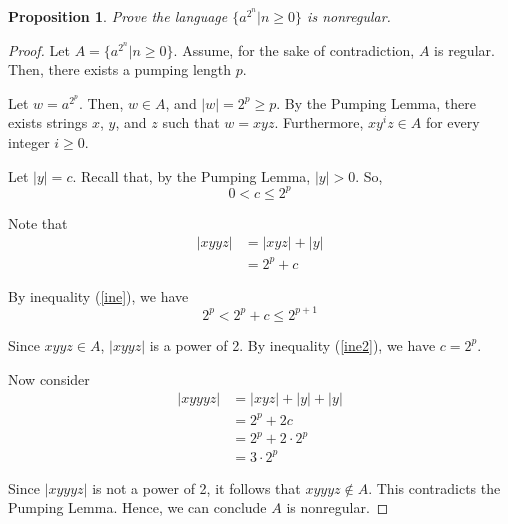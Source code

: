 \documentclass{article}
\newtheorem{proposition}{Proposition}
\begin{document}
\begin{proposition}
Prove the language $\{a^{2^n}|n \ge 0\}$ is nonregular.
\end{proposition}

\begin{proof}
Let $A=\{a^{2^n}|n\ge0\}$. Assume, for the sake of contradiction,
$A$ is regular. Then, there exists a pumping length $p$.

Let
$w=a^{2^p}$. Then, $w \in A$, and $|w|=2^p \ge p$. By the Pumping
Lemma, there exists strings $x$, $y$, and $z$ such that $w=xyz$. Furthermore, $xy^iz \in A$ for every integer $i \ge 0$.

Let $|y|=c$. Recall that, by the Pumping Lemma, $|y|>0$. So,
\begin{equation}
\label{ine}
0 < c \le 2^p
\end{equation}

Note that
\begin{align*}
|xyyz|&=|xyz|+|y|\\
&=2^p+c
\end{align*}

By inequality (\ref{ine}), we have
\begin{equation}
\label{ine2}
2^p < 2^p+c \le 2^{p+1}
\end{equation}

Since $xyyz \in A$, $|xyyz|$ is a power of 2. By inequality (\ref{ine2}),
we have $c=2^p$.

Now consider
\begin{align*}
|xyyyz|&=|xyz|+|y|+|y|\\
&=2^p+2c\\
&=2^p+2 \cdot 2^p\\
&=3 \cdot 2^p
\end{align*}

Since $|xyyyz|$ is not a power of 2, it follows that $xyyyz \notin A$. This contradicts
the Pumping Lemma. Hence, we can conclude $A$ is nonregular.
\end{proof}
\end{document}
